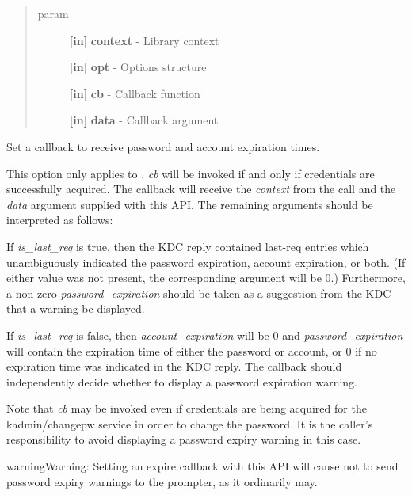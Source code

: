 \documentclass[letterpaper,10pt,english]{sphinxmanual}
\begin{document}
\begin{quote}\begin{description}
\item[{param}] \leavevmode
\textbf{{[}in{]}} \textbf{context} - Library context

\textbf{{[}in{]}} \textbf{opt} - Options structure

\textbf{{[}in{]}} \textbf{cb} - Callback function

\textbf{{[}in{]}} \textbf{data} - Callback argument

\end{description}\end{quote}

Set a callback to receive password and account expiration times.

This option only applies to {\hyperref[appdev/refs/api/krb5_get_init_creds_password:krb5_get_init_creds_password]{}} . \emph{cb} will be invoked if and only if credentials are successfully acquired. The callback will receive the \emph{context} from the {\hyperref[appdev/refs/api/krb5_get_init_creds_password:krb5_get_init_creds_password]{}} call and the \emph{data} argument supplied with this API. The remaining arguments should be interpreted as follows:

If \emph{is\_last\_req} is true, then the KDC reply contained last-req entries which unambiguously indicated the password expiration, account expiration, or both. (If either value was not present, the corresponding argument will be 0.) Furthermore, a non-zero \emph{password\_expiration} should be taken as a suggestion from the KDC that a warning be displayed.

If \emph{is\_last\_req} is false, then \emph{account\_expiration} will be 0 and \emph{password\_expiration} will contain the expiration time of either the password or account, or 0 if no expiration time was indicated in the KDC reply. The callback should independently decide whether to display a password expiration warning.

Note that \emph{cb} may be invoked even if credentials are being acquired for the kadmin/changepw service in order to change the password. It is the caller's responsibility to avoid displaying a password expiry warning in this case.

\begin{notice}{warning}{Warning:}
Setting an expire callback with this API will cause {\hyperref[appdev/refs/api/krb5_get_init_creds_password:krb5_get_init_creds_password]{}} not to send password expiry warnings to the prompter, as it ordinarily may.
\end{notice}
\end{document}
